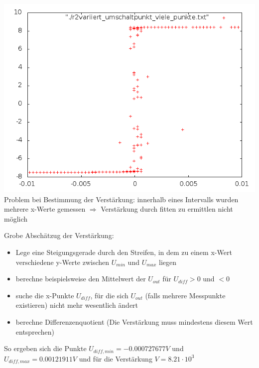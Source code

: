 \documentclass[compress,11pt]{beamer}
\begin{document}
\begin{frame}
\includegraphics[width=.7\textwidth]{../problem}\\
Problem bei Bestimmung der Verstärkung:  innerhalb eines Intervalls wurden mehrere x-Werte gemessen $\Rightarrow$ Verstärkung durch fitten zu ermittlen nicht möglich
\end{frame}
\begin{frame}
Grobe Abschätzug der Verstärkung:\begin{itemize}
\item Lege eine Steigungsgerade durch den Streifen, in dem zu einem x-Wert verschiedene y-Werte zwischen $U_{min}$ und $U_{max}$ liegen
\item berechne beispielsweise den Mittelwert der $U_{out}$ für $U_{diff} > 0$ und $ < 0$
\item suche die x-Punkte $U_{diff}$, für die sich $U_{out}$ (falls mehrere Messpunkte existieren) nicht mehr wesentlich ändert
\item berechne Differenzenquotient (Die Verstärkung muss mindestens diesem Wert entsprechen)
\end{itemize}
So ergeben sich die Punkte $U_{diff,min} = -0.000727677 V$ und $U_{diff,max} = 0.00121911 V$ und für die Verstärkung $V = 8.21 \cdot 10^3$
\end{frame}
\end{document}
